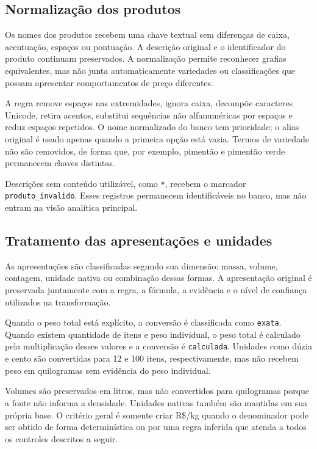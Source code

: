 \documentclass[12pt,a4paper]{article}
\begin{document}
\subsection{Normalização dos produtos}

Os nomes dos produtos recebem uma chave textual sem diferenças de caixa,
acentuação, espaços ou pontuação. A descrição original e o identificador do
produto continuam preservados. A normalização permite reconhecer grafias
equivalentes, mas não junta automaticamente variedades ou classificações que
possam apresentar comportamentos de preço diferentes.

A regra remove espaços nas extremidades, ignora caixa, decompõe caracteres
Unicode, retira acentos, substitui sequências não alfanuméricas por espaços e
reduz espaços repetidos. O nome normalizado do banco tem prioridade; o alias
original é usado apenas quando a primeira opção está vazia. Termos de variedade
não são removidos, de forma que, por exemplo, pimentão e pimentão verde
permanecem chaves distintas.

Descrições sem conteúdo utilizável, como \texttt{*}, recebem o marcador
\texttt{produto\_invalido}. Esses registros permanecem identificáveis no banco,
mas não entram na visão analítica principal.

\subsection{Tratamento das apresentações e unidades}

As apresentações são classificadas segundo sua dimensão: massa, volume,
contagem, unidade nativa ou combinação dessas formas. A apresentação original
é preservada juntamente com a regra, a fórmula, a evidência e o nível de
confiança utilizados na transformação.

Quando o peso total está explícito, a conversão é classificada como
\texttt{exata}. Quando existem quantidade de itens e peso individual, o peso
total é calculado pela multiplicação desses valores e a conversão é
\texttt{calculada}. Unidades como dúzia e cento são convertidas para 12 e 100
itens, respectivamente, mas não recebem peso em quilogramas sem evidência do
peso individual.

Volumes são preservados em litros, mas não convertidos para quilogramas porque
a fonte não informa a densidade. Unidades nativas também são mantidas em sua
própria base. O critério geral é somente criar R\$/kg quando o denominador pode
ser obtido de forma determinística ou por uma regra inferida que atenda a todos
os controles descritos a seguir.
\end{document}
